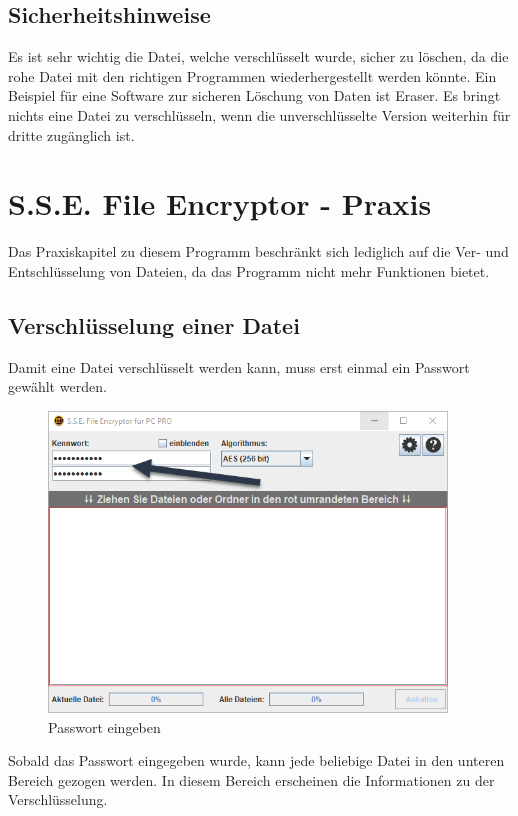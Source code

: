 \documentclass[12pt,a4paper]{scrreprt}
\begin{document}
\section{Sicherheitshinweise}
Es ist sehr wichtig die Datei, welche verschlüsselt wurde, sicher zu löschen, da die rohe Datei mit den richtigen Programmen wiederhergestellt werden könnte. Ein Beispiel für eine Software zur sicheren Löschung von Daten ist Eraser. Es bringt nichts eine Datei zu verschlüsseln, wenn die unverschlüsselte Version weiterhin für dritte zugänglich ist.

\chapter{S.S.E. File Encryptor - Praxis}
Das Praxiskapitel zu diesem Programm beschränkt sich lediglich auf die Ver- und Entschlüsselung von Dateien, da das Programm nicht mehr Funktionen bietet.

\section{Verschlüsselung einer Datei}
Damit eine Datei verschlüsselt werden kann, muss erst einmal ein Passwort gewählt werden.

\begin{figure}[h]
\begin{center}
\includegraphics[width=300pt]{media/sse1.png}
\caption{Passwort eingeben}
\label{sse1}
\end{center}
\end{figure}

\newpage

\noindent Sobald das Passwort eingegeben wurde, kann jede beliebige Datei in den unteren Bereich gezogen werden. In diesem Bereich erscheinen die Informationen zu der Verschlüsselung.
\end{document}
